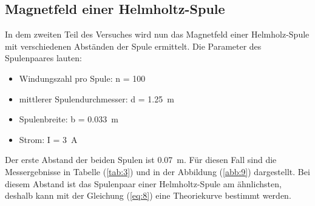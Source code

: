 \subsection{Magnetfeld einer Helmholtz-Spule}

In dem zweiten Teil des Versuches wird nun das Magnetfeld einer Helmholz-Spule mit
verschiedenen Abständen der Spule ermittelt. Die Parameter des Spulenpaares lauten:

\begin{itemize}
  \item Windungszahl pro Spule: n = 100
  \item mittlerer Spulendurchmesser: d = \SI{1.25}{\meter}
  \item Spulenbreite: b = \SI{0.033}{\meter}
  \item Strom: I = \SI{3}{\ampere}
\end{itemize}

Der erste Abstand der beiden Spulen ist \SI{0.07}{\meter}. Für diesen Fall sind
die Messergebnisse in Tabelle (\ref{tab:3}) und in der Abbildung (\ref{abb:9})
dargestellt. Bei diesem Abstand ist das Spulenpaar einer Helmholtz-Spule am ähnlichsten,
deshalb kann mit der Gleichung (\ref{eq:8}) eine Theoriekurve bestimmt werden.

